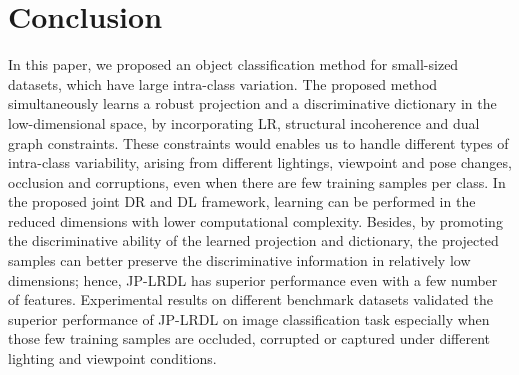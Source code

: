 \documentclass[journal]{IEEEtran}
\begin{document}
\section{Conclusion}
\label{sec:conclusion}
In this paper, we proposed an object classification method for small-sized datasets, which have large intra-class variation. The proposed method simultaneously learns a robust projection and a discriminative dictionary in the low-dimensional space, by incorporating LR, structural incoherence and dual graph constraints. These constraints would enables us to handle different types of intra-class variability, arising from different lightings, viewpoint and pose changes, occlusion and corruptions, even when there are few training samples per class. In the proposed joint DR and DL framework, learning can be performed in the reduced dimensions with lower computational complexity. Besides, by promoting the discriminative ability of the learned projection and dictionary, the projected samples can better preserve the discriminative information in relatively low dimensions; hence, JP-LRDL has superior performance even with a few number of features. Experimental results on different benchmark datasets validated the superior performance of JP-LRDL on image classification task especially when those few training samples are occluded, corrupted or captured under different lighting and viewpoint conditions.


\end{document}
